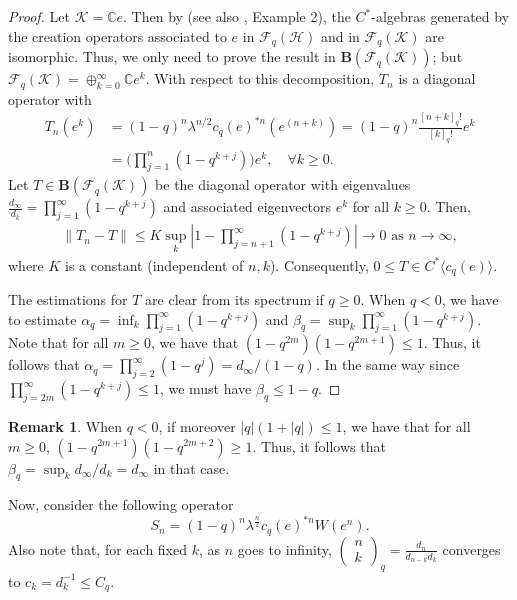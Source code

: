 \documentclass[12pt, a4paper,reqno]{amsart}
\theoremstyle{definition}
\newtheorem{Remark}[Theorem]{Remark}
\renewcommand{\leq}{\leqslant}
\renewcommand{\geq}{\geqslant}
\def\C{\mathbb C}
\begin{document}
\begin{proof}
Let $\mathcal{K}=\C e$. Then by \cite[Thm. 3.6]{W17} (see also \cite{W18}, \cite{JSW} Example 2), the $C^*$-algebras generated by the
creation operators associated to $e$ in $\mathcal F_q(\mathcal
H)$ and in $\mathcal F_q(\mathcal K)$ are isomorphic. Thus, we only need to prove the result in $\mathbf
B(\mathcal F_q(\mathcal K))$; but $\mathcal F_q(\mathcal K)= \oplus_{k=0}^\infty
\C e^{k}$. With respect to this decomposition, $T_n$ is a
diagonal operator with 
\begin{align*}
T_n( e^{ k})&= (1-q)^n\lambda^{n/2} c_q(e)^{* n } (e^{(n+k)})
= (1-q)^n \frac{[n+k]_q!}{[k]_q!} e^{k}\\
&= \Big(\prod_{j=1}^n (1-q^{k+j})\Big)e^{k},\quad \forall k\geq 0.
\end{align*}
Let $T\in\mathbf{B}(\mathcal F_q(\mathcal K))$ be the diagonal operator with eigenvalues $\frac{d_\infty}{d_k}=\prod_{j=1}^\infty (1-q^{k+j})$ and associated eigenvectors $e^{k}$ for all $k\geq 0$. Then, 
\begin{align*}
\| T_n-T\|\leq K\sup_{k} |1- \prod_{j=n+1}^\infty  (1-q^{k+j})| \to 0\text{ as }n\to \infty, 
\end{align*}
where $K$ is a constant (independent of $n,k$). Consequently, $0\leq T\in C^*\langle c_q(e)\rangle$. 

The estimations for $T$ are clear from its spectrum if $q\geq 0$. When $q<0$, we have to estimate $\alpha_q=\inf_{k}\prod_{j=1}^\infty (1-q^{k+j})$ and $\beta_q=\sup_{k}\prod_{j=1}^\infty (1-q^{k+j})$. Note that 
for all $m\geq0$, we have that $(1-q^{2m})(1-q^{2m+1})\leq 1$. Thus, it follows that $\alpha_q=\prod_{j=2}^\infty (1-q^{j})=d_\infty/(1-q)$.  In the same way since $\prod_{j=2m}^\infty (1-q^{k+j})\leq 1$, we must have $\beta_q\leq 1-q$.
\end{proof}

\begin{Remark}\label{estofT}
When $q<0$, if moreover $|q| (1+|q|)\leq 1$, we have that for all $m\geq 0$, 
$(1-q^{2m+1})(1-q^{2m+2})\geq 1$. Thus, it follows that $\beta_q=\sup_{k} d_\infty/d_k=d_\infty$ in that case. 
\end{Remark}

Now, consider the following operator $$ S_n = (1-q)^n \lambda^{ \frac{n}{2} }  {c_q(e)}^{ *n} W(e^{n}).$$
Also note that, for each fixed $k$, as $n$ goes to infinity, $\left( \begin{matrix} n\\ k \end{matrix}\right)_q=\frac{d_{n}}{d_{n-k}d_k}$ converges to  $c_k=d_k^{-1}\leq C_q$.
\end{document}
